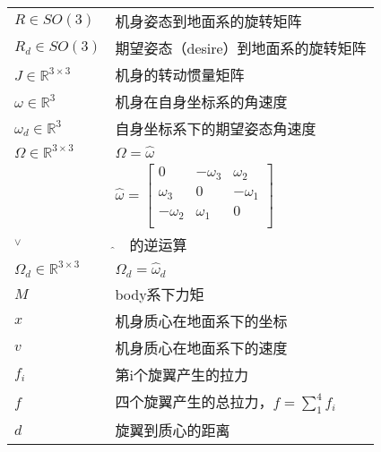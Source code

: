
\begin{nomenclature*}
\label{chap:symb}

\begin{longtable}{ll}
  $R \in SO(3)$                            & 机身姿态到地面系的旋转矩阵     \\
  $R_d \in SO(3)$                          & 期望姿态（desire）到地面系的旋转矩阵   \\
  $J\in \mathbb{R}^{3 \times 3}$           & 机身的转动惯量矩阵           \\
  $\omega \in \mathbb{R}^{3}$              & 机身在自身坐标系的角速度         \\
  $\omega_d \in \mathbb{R}^{3}$            & 自身坐标系下的期望姿态角速度 \\
  $\Omega  \in  \mathbb{R}^{3 \times 3}$   & $\Omega=\widehat \omega $   \\
  $\widehat{}$ &
  $\widehat \omega =\begin{bmatrix}
    0 &-\omega_3  &\omega_2  \\
    \omega_3 & 0 & -\omega_1 \\
    -\omega_2 & \omega_1 & 0 \\
    \end{bmatrix}$   \\

    ${}^\vee$ & $\widehat{} \quad$的逆运算 \\
  $\Omega_d  \in  \mathbb{R}^{3 \times 3}$ & $\Omega_d=\widehat \omega_d$     \\
  $M$                                      & body系下力矩                 \\  
  $x$ & 机身质心在地面系下的坐标\\
  $v$ & 机身质心在地面系下的速度\\
  $f_i$ & 第i个旋翼产生的拉力 \\
  $f$  & 四个旋翼产生的总拉力，$f=\sum_{1}^{4} f_i$\\
  $d$ & 旋翼到质心的距离 \\
\end{longtable}

\end{nomenclature*}
